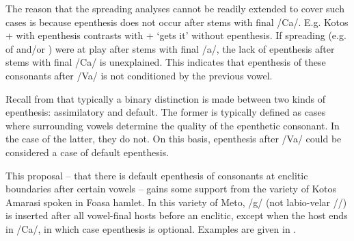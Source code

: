 \documentclass[output=paper]{langscibook}
\begin{document}
\begin{exe}
\label{ex:DefEpe}
	\begin{xlist}
	\end{xlist}
\end{exe}

The reason that the spreading analyses cannot be readily
extended to cover such cases is because epenthesis does
not occur after stems with final /Ca/.
E.g. Kotos  +  {\ra}  with epenthesis
contrasts with  +  {\ra}  `gets it' without epenthesis.
If spreading (e.g. of \tsc{[+low]} and/or \tsc{[+voice]})
were at play after stems with final /a/,
the lack of epenthesis after stems with final /Ca/ is unexplained.
This indicates that epenthesis of these consonants after /Va/
is not conditioned by the previous vowel.

Recall from  that typically a binary distinction is made 
between two kinds of epenthesis: assimilatory and default. The former is typically defined as cases 
where surrounding vowels determine the quality of the epenthetic consonant. 
In the case of the latter, they do not.
On this basis, epenthesis after /Va/ could
be considered a case of default epenthesis.

This proposal  -- that there is default epenthesis of 
consonants at enclitic boundaries after certain vowels  --
gains some support from the variety of Kotos Amarasi spoken
in Fo{\Q}asa{\Q} hamlet. In this variety of Meto, /g/
(not labio-velar /\gw/) is inserted after all
vowel-final hosts before an enclitic,
except when the host ends in /Ca/,
in which case epenthesis is optional.
Examples are given in .
\end{document}
